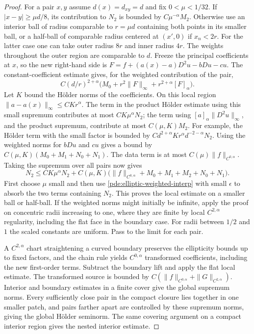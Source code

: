 \documentclass[11pt,oneside,openany]{book}
\theoremstyle{plain}
\theoremstyle{definition}
\theoremstyle{remark}
\begin{document}
\begin{proof}
For a pair \(x,y\) assume \(d(x)=d_{xy}=d\) and fix
\(0<\mu<1/32\). If \(|x-y|\geq\mu d/8\), its
contribution to \(N_2\) is bounded by \(C\mu^{-\alpha}M_2\).
Otherwise use an interior ball of radius comparable to
\(r=\mu d\) containing both points in its smaller ball,
or a half-ball of comparable radius centered at \((x',0)\)
if \(x_n<2r\). For the latter case one can take outer
radius \(8r\) and inner radius \(4r\).
The weights throughout the outer region are comparable to \(d\).
Freeze the principal coefficients at \(x\), so the new
right-hand side is
\(F=f+(a(x)-a)D^2u-bDu-cu\).
The constant-coefficient estimate gives, for the weighted
contribution of the pair,
\[
 C(d/r)^{2+\alpha}
       \bigl(M_0+r^2\|F\|_\infty+r^{2+\alpha}[F]_\alpha\bigr).
\]
Let \(K\) bound the Hölder norms of the coefficients.
On this local region \(\|a-a(x)\|_\infty\leq CKr^\alpha\).
The term in the product Hölder estimate using this small
supremum contributes at most \(CK\mu^\alpha N_2\);
the term using \([a]_\alpha\|D^2u\|_\infty\), and the product
supremum, contribute at most \(C(\mu,K)M_2\).
For example, the Hölder term with the small factor is
bounded by \(C d^{2+\alpha}Kr^\alpha
d^{-2-\alpha}N_2\).
Using the weighted norms for \(bDu\) and \(cu\) gives a
bound by \(C(\mu,K)(M_0+M_1+N_0+N_1)\).
The data term is at most \(C(\mu)\|f\|_{C^{0,\alpha}}\).
Taking the supremum over all pairs now gives
\[
 N_2\leq CK\mu^\alpha N_2
    +C(\mu,K)\bigl(\|f\|_{C^{0,\alpha}}+M_0+
                                     M_1+M_2+N_0+N_1\bigr).
\]
First choose \(\mu\) small and then use
\eqref{pde:elliptic-weighted-interp} with small \(\epsilon\)
to absorb the two terms containing \(N_2\). This proves
the local estimate on a smaller ball or half-ball.
If the weighted norms might initially be infinite, apply
the proof on concentric radii increasing to one, where
they are finite by local \(C^{2,\alpha}\) regularity,
including the flat face in the boundary case.
For radii between \(1/2\) and \(1\) the scaled constants
are uniform. Pass to the limit for each pair.

A \(C^{2,\alpha}\) chart straightening a curved boundary
preserves the ellipticity bounds up to fixed factors, and
the chain rule yields \(C^{0,\alpha}\) transformed
coefficients, including the new first-order terms.
Subtract the boundary lift and apply the flat local
estimate. The transformed source is bounded by
\(C(\|f\|_{C^{0,\alpha}}+\|G\|_{C^{2,\alpha}})\).
Interior and boundary estimates in a finite cover give
the global supremum norms. Every sufficiently close pair
in the compact closure lies together in one smaller patch,
and pairs farther apart are controlled by these supremum
norms, giving the global Hölder seminorm. The same covering
argument on a compact interior region gives the nested
interior estimate.
\end{proof}
\end{document}
